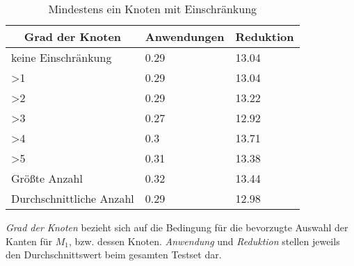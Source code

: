 \begin{table}[htb]
\caption{Mindestens ein Knoten mit Einschränkung\label{tab:degreeOR}}
\vspace*{1em}
\centering

\bgroup
\def\arraystretch{1.3}%

\begin{threeparttable}

\begin{tabular}[c]{l|l|l}
	
	\multicolumn{1}{c|}{\textbf{Grad der Knoten}} & 
	\multicolumn{1}{c|}{\textbf{Anwendungen}} & 
	\multicolumn{1}{c}{\textbf{Reduktion}} \\ 
	
	\hline

	keine Einschränkung&0.29&13.04\\
	>1&0.29 &13.04 \\
	>2&0.29 &13.22 \\
	>3& 0.27& 12.92 \\
	>4& 0.3& 13.71 \\
	>5& 0.31&13.38 \\
	Größte Anzahl& 0.32&13.44 \\
	Durchschnittliche Anzahl& 0.29&12.98 \\
	
\end{tabular}
\begin{tablenotes}\footnotesize
\item \emph{Grad der Knoten} bezieht sich auf die Bedingung für die bevorzugte Auswahl der Kanten für $M_{1}$, bzw. dessen Knoten. \emph{Anwendung} und \emph{Reduktion} stellen jeweils den Durchschnittswert beim gesamten Testset dar.
\end{tablenotes}

\end{threeparttable}

\egroup

\end{table}

